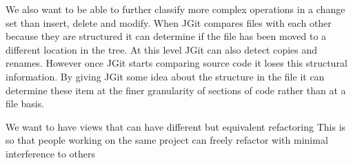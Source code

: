 We also want to be able to further classify more complex operations in a change set than insert, delete and modify.  When JGit compares files with each other because they are structured it can determine if the file has been moved to a different location in the tree.  At this level JGit can also detect copies and renames.  However once JGit starts comparing source code it loses this structural information.  By giving JGit some idea about the structure in the file it can determine these item at the finer granularity of sections of code rather than at a file basis.

We want to have views that can have different but equivalent refactoring
This is so that people working on the same project can freely refactor with minimal interference to others
